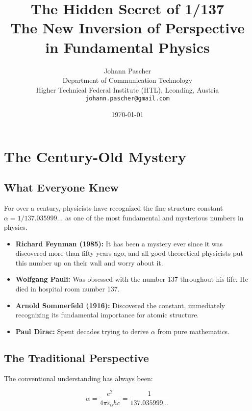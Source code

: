\documentclass[12pt,a4paper]{article}
\title{
	\textbf{The Hidden Secret of 1/137}\\
	\vspace{0.5cm}
	\Large The New Inversion of Perspective in Fundamental Physics
}
\author{Johann Pascher\\
	Department of Communication Technology\\
	Higher Technical Federal Institute (HTL), Leonding, Austria\\
	\texttt{johann.pascher@gmail.com}}
\date{\today}
\theoremstyle{definition}
\begin{document}
	
	\maketitle
	\thispagestyle{empty}
	\newpage
	
	\tableofcontents
	\newpage
	
	\section{The Century-Old Mystery}
	
	\subsection{What Everyone Knew}
	
	For over a century, physicists have recognized the fine structure constant $\alpha = 1/137.035999...$ as one of the most fundamental and mysterious numbers in physics.
	
	\begin{fundamental}
		\begin{itemize}
			\item \textbf{Richard Feynman (1985):} It has been a mystery ever since it was discovered more than fifty years ago, and all good theoretical physicists put this number up on their wall and worry about it.
			
			\item \textbf{Wolfgang Pauli:} Was obsessed with the number 137 throughout his life. He died in hospital room number 137.
			
			\item \textbf{Arnold Sommerfeld (1916):} Discovered the constant, immediately recognizing its fundamental importance for atomic structure.
			
			\item \textbf{Paul Dirac:} Spent decades trying to derive $\alpha$ from pure mathematics.
		\end{itemize}
	\end{fundamental}
	
	\subsection{The Traditional Perspective}
	
	The conventional understanding has always been:
	
	\begin{equation}
		\alpha = \frac{e^2}{4\pi\varepsilon_0\hbar c} = \frac{1}{137.035999...}
	\end{equation}
	
\end{document}
